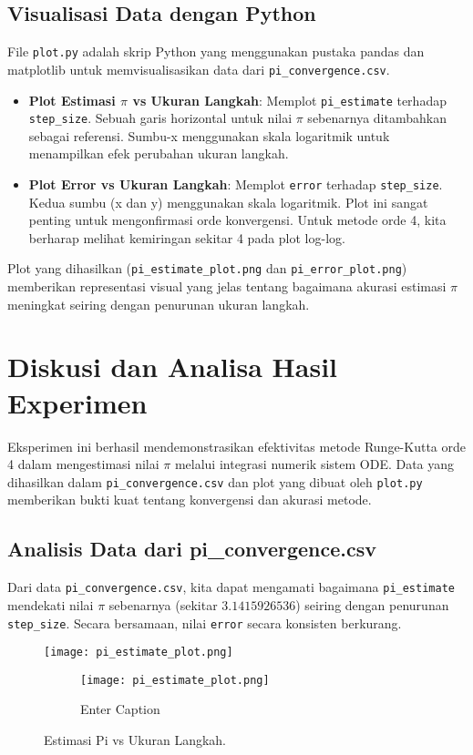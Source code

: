 \documentclass[conference]{IEEEtran}
\begin{document}
\subsection{Visualisasi Data dengan Python}
File \texttt{plot.py} adalah skrip Python yang menggunakan pustaka pandas dan matplotlib untuk memvisualisasikan data dari \texttt{pi\_convergence.csv}.
\begin{itemize}
\item \textbf{Plot Estimasi $\pi$ vs Ukuran Langkah}: Memplot \texttt{pi\_estimate} terhadap \texttt{step\_size}. Sebuah garis horizontal untuk nilai $\pi$ sebenarnya ditambahkan sebagai referensi. Sumbu-x menggunakan skala logaritmik untuk menampilkan efek perubahan ukuran langkah.
\item \textbf{Plot Error vs Ukuran Langkah}: Memplot \texttt{error} terhadap \texttt{step\_size}. Kedua sumbu (x dan y) menggunakan skala logaritmik. Plot ini sangat penting untuk mengonfirmasi orde konvergensi. Untuk metode orde 4, kita berharap melihat kemiringan sekitar 4 pada plot log-log.
\end{itemize}
Plot yang dihasilkan (\texttt{pi\_estimate\_plot.png} dan \texttt{pi\_error\_plot.png}) memberikan representasi visual yang jelas tentang bagaimana akurasi estimasi $\pi$ meningkat seiring dengan penurunan ukuran langkah.

\section{Diskusi dan Analisa Hasil Experimen}
Eksperimen ini berhasil mendemonstrasikan efektivitas metode Runge-Kutta orde 4 dalam mengestimasi nilai $\pi$ melalui integrasi numerik sistem ODE. Data yang dihasilkan dalam \texttt{pi\_convergence.csv} dan plot yang dibuat oleh \texttt{plot.py} memberikan bukti kuat tentang konvergensi dan akurasi metode.

\subsection{Analisis Data dari pi\_convergence.csv}
Dari data \texttt{pi\_convergence.csv}, kita dapat mengamati bagaimana \texttt{pi\_estimate} mendekati nilai $\pi$ sebenarnya (sekitar $3.1415926536$) seiring dengan penurunan \texttt{step\_size}. Secara bersamaan, nilai \texttt{error} secara konsisten berkurang.

\begin{figure}[htbp]
\centerline{\texttt{[image: pi\_estimate\_plot.png]}}
\begin{figure}
    \centering
    \texttt{[image: pi\_estimate\_plot.png]}
    \caption{Enter Caption}
    \label{fig:enter-label}
\end{figure}
\caption{Estimasi Pi vs Ukuran Langkah.}
\label{fig:pi_estimate}
\end{figure}
\end{document}
